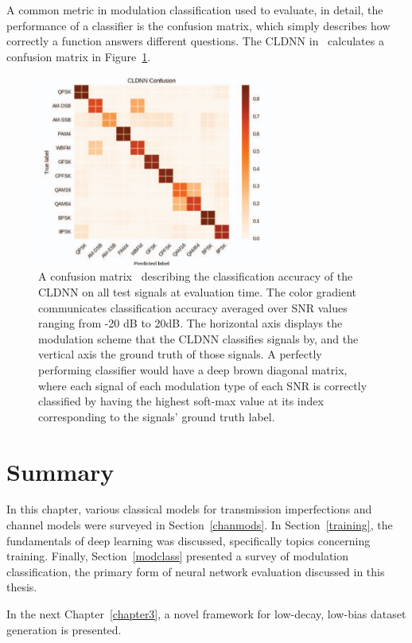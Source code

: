 A common metric in modulation classification used to evaluate, in detail, the performance of a classifier is the confusion matrix, which simply describes how correctly a function answers different questions. The CLDNN in~\cite{modclassback} calculates a confusion matrix in Figure~\ref{fig:confmodclass}.
\FloatBarrier
\begin{figure}[ht!]
	\centering	\includegraphics[width=0.7\textwidth,keepaspectratio]{figs/conf.png}
    \caption{A confusion matrix~\cite{modclassback} describing the classification accuracy of the CLDNN on all test signals at evaluation time. The color gradient communicates classification accuracy averaged over SNR values ranging from -20 dB to 20dB. The horizontal axis displays the modulation scheme that the CLDNN classifies signals by, and the vertical axis the ground truth of those signals. A perfectly performing classifier would have a deep brown diagonal matrix, where each signal of each modulation type of each SNR is correctly classified by having the highest soft-max value at its index corresponding to the signals' ground truth label.}
\label{fig:confmodclass}      
\end{figure}
\FloatBarrier
\section{Summary}
In this chapter, various classical models for transmission imperfections and channel models were surveyed in Section~\ref{chanmods}. In Section~\ref{training}, the fundamentals of deep learning was discussed, specifically topics concerning training. Finally, Section~\ref{modclass} presented a survey of modulation classification, the primary form of neural network evaluation discussed in this thesis.

In the next Chapter~\ref{chapter3}, a novel framework for low-decay, low-bias dataset generation is presented.\\
